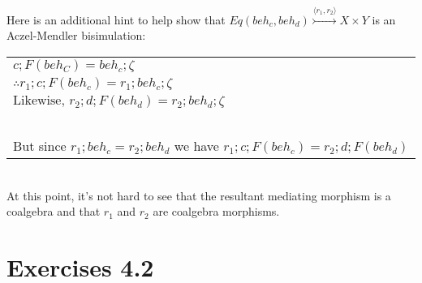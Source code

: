 \documentclass{article}
\begin{document}
Here is an additional hint to help show that $\mathit{Eq}(\mathit{beh}_c, \mathit{beh}_d) \overset{\langle r_1, r_2 \rangle}{\rightarrowtail} X \times Y$ is an Aczel-Mendler bisimulation:
\begin{center}
\begin{tabular}{l}
$c;F(\mathit{beh}_C) = \mathit{beh}_{c};\zeta$ \\
$\therefore r_1;c;F(\mathit{beh}_c) = r_1;\mathit{beh}_{c};\zeta$ \\
$\text{Likewise, } r_2;d;F(\mathit{beh}_d) = r_2;\mathit{beh}_d;\zeta$ \\~\\
But since $r_1;\mathit{beh}_c = r_2;\mathit{beh}_d$ we have $r_1;c;F(\mathit{beh}_c) = r_2;d;F(\mathit{beh}_d)$
\end{tabular}
\end{center}~\\
At this point, it's not hard to see that the resultant mediating morphism is a coalgebra and that $r_1$ and
$r_2$ are coalgebra morphisms. 

\section*{Exercises 4.2}
\end{document}
